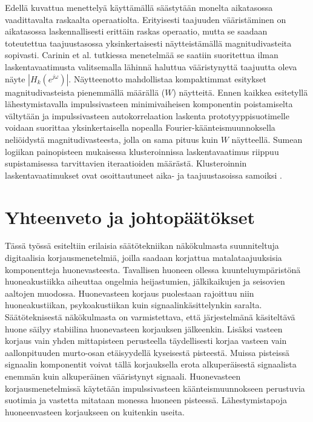 \documentclass[finnish,12pt]{article}
\begin{document}
Edellä kuvattua menettelyä käyttämällä säästytään monelta aikatasossa vaadittavalta raskaalta operaatiolta. Erityisesti taajuuden vääristäminen on aikatasossa laskennallisesti erittäin raskas operaatio, mutta se saadaan toteutettua taajuustasossa yksinkertaisesti näytteistämällä magnitudivasteita sopivasti. Carinin et al. tutkiessa menetelmää \cite{ACarini2012} se saatiin suoritettua ilman laskentavaatimusta valitsemalla lähinnä haluttua vääristynyttä taajuutta oleva näyte $\left| H_k(e^{j \omega}) \right|$. Näytteenotto mahdollistaa kompaktimmat esitykset magnitudivasteista pienemmällä määrällä ($W$) näytteitä. Ennen kaikkea esitetyllä lähestymistavalla impulssivasteen minimivaiheisen komponentin poistamiselta vältytään ja impulssivasteen autokorrelaation laskenta prototyyppisuotimelle voidaan suorittaa yksinkertaisella nopealla Fourier-käänteismuunnoksella neliöidystä magnitudivasteesta, jolla on sama pituus kuin $W$ näytteellä. Sumean logiikan painopisteen mukaisessa klusteroinnissa laskentavaatimus riippuu supistamisessa tarvittavien iteraatioiden määrästä. Klusteroinnin laskentavaatimukset ovat osoittautuneet aika- ja taajuustasoissa samoiksi \cite{ACarini2012}.

\clearpage

\section{Yhteenveto ja johtopäätökset}

Tässä työssä esiteltiin erilaisia säätötekniikan näkökulmasta suunniteltuja digitaalisia korjausmenetelmiä, joilla saadaan korjattua matalataajuuksisia komponentteja huonevasteesta. Tavallisen huoneen ollessa kuunteluympäristönä huoneakustiikka aiheuttaa ongelmia heijastumien, jälkikaikujen ja seisovien aaltojen muodossa. Huonevasteen korjaus puolestaan rajoittuu niin huoneakustiikan, psykoakustiikan kuin signaalinkäsittelynkin saralta. Säätöteknisestä näkökulmasta on varmistettava, että järjestelmänä käsiteltävä huone säilyy stabiilina huonevasteen korjauksen jälkeenkin. Lisäksi vasteen korjaus vain yhden mittapisteen perusteella täydellisesti korjaa vasteen vain aallonpituuden murto-osan etäisyydellä kyseisestä pisteestä. Muissa pisteissä signaalin komponentit voivat tällä korjauksella erota alkuperäisestä signaalista enemmän kuin alkuperäinen vääristynyt signaali. Huonevasteen korjausmenetelmissä käytetään impulssivasteen käänteismuunnokseen perustuvia suotimia ja vastetta mitataan monessa huoneen pisteessä. Lähestymistapoja huoneenvasteen korjaukseen on kuitenkin useita. 
\end{document}
